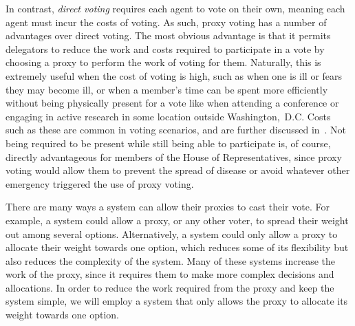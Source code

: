 In contrast, \textit{direct voting} requires each agent to vote on their own, meaning
each agent must incur the costs of voting.
As such, proxy voting has a number of advantages over direct voting.
The most obvious advantage is that it permits delegators to reduce the work and costs
required to participate in a vote by choosing a proxy to perform the work of voting
for them.
Naturally, this is extremely useful when the cost of voting is high, such as
when one is ill or fears they may become ill, or when a member's time can be spent
more efficiently without being physically present for a vote like when attending a
conference or engaging in active research in some location outside {Washington,~D.C}.
Costs such as these are common in voting scenarios, and are further discussed
in~\cite{Gershtein2019}.
Not being required to be present while still being able to participate is, of course,
directly advantageous for members of the House of Representatives, since proxy voting
would allow them to prevent the spread of disease or avoid whatever other emergency
triggered the use of proxy voting.

There are many ways a system can allow their proxies to cast their vote.
For example, a system could allow a proxy, or any other voter, to spread their weight
out among several options.
Alternatively, a system could only allow a proxy to allocate their weight towards one
option, which reduces some of its flexibility but also reduces the complexity of the
system.
Many of these systems increase the work of the proxy, since it requires them to make
more complex decisions and allocations.
In order to reduce the work required from the proxy and keep the system simple, we
will employ a system that only allows the proxy to allocate its weight towards one
option.

